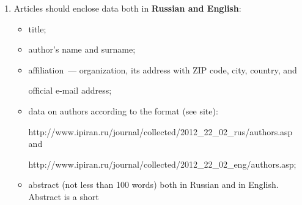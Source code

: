{{\begin{enumerate}[1.]
The templates for the manuscript typesetting are presented on site:





{\sf


http://www.ipiran.ru/publication/collected/template.doc}\\[-13.5pt]












\thispagestyle{empty}





\item Articles should enclose data both in \textbf{Russian and English}:


\begin{itemize}


\item title;\\[-13.5pt]


\item author's name and surname;\\[-13.5pt]


\item affiliation~--- organization, its address with ZIP code, city, country, and


official e-mail address;\\[-13.5pt]


\item data on authors according to the format (see site):





{\sf http://www.ipiran.ru/journal/collected/2012\_22\_02\_rus/authors.asp}  and





{\sf  http://www.ipiran.ru/journal/collected/2012\_22\_02\_eng/authors.asp};\\[-13.5pt]





\thispagestyle{empty}





\item abstract (not less than 100 words) both in Russian and in English. Abstract is a short



\end{itemize}
\end{enumerate}}}
